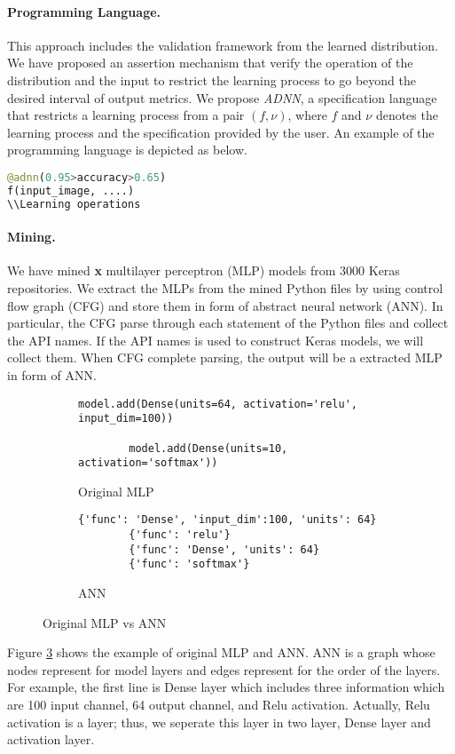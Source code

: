 \paragraph{\textbf{Programming Language.}} This approach includes the validation framework from the learned distribution. We have proposed an assertion mechanism that verify the operation of the distribution and the input to restrict the learning process to go beyond the desired interval of output metrics. We propose \emph{ADNN}, a specification language that restricts a learning process from a pair $(f,\nu)$, where $f$ and $\nu$ denotes the learning process and the specification provided by the user. An example of the programming language is depicted as below.
\begin{lstlisting}[language=Python, caption=Accountable specification language]
@adnn(0.95>accuracy>0.65)
f(input_image, ....)
\\Learning operations
\end{lstlisting}

\paragraph{\textbf{Mining.}}We have mined {\bf x} multilayer perceptron (MLP) models from 3000 Keras repositories. We extract the MLPs from the mined Python files by using control flow graph (CFG) and store them in form of abstract neural network (ANN). In particular, the CFG parse through each statement of the Python files and collect the API names. If the API names is used to construct Keras models, we will collect them. When CFG complete parsing, the output will be a extracted MLP in form of ANN.
\begin{figure}[H]
	\centering
	\begin{subfigure}[b]{.45\linewidth}
		\begin{lstlisting}[basicstyle=\tiny,numberblanklines=false]
		model.add(Dense(units=64, activation='relu', input_dim=100)) 
		
		model.add(Dense(units=10, activation='softmax'))
		\end{lstlisting}
		\caption{Original MLP}
		\label{fig:originalCNN}
	\end{subfigure}
	\begin{subfigure}[b]{.45\linewidth}
		\begin{lstlisting}[basicstyle=\tiny,numberblanklines=false]	
		{'func': 'Dense', 'input_dim':100, 'units': 64} 
		{'func': 'relu'}
		{'func': 'Dense', 'units': 64}
		{'func': 'softmax'}
		\end{lstlisting}
		\caption{ANN}
		\label{fig:convertedCNN}
	\end{subfigure}
	\caption{Original MLP vs ANN}
	\label{fig:converted}
\end{figure}
Figure \ref{fig:converted} shows the example of original MLP and ANN. ANN is a graph whose nodes represent for model layers and edges represent for the order of the layers. For example, the first line is Dense layer which includes three information which are 100 input channel, 64 output channel, and Relu activation. Actually, Relu activation is a layer; thus, we seperate this layer in two layer, Dense layer and activation layer.